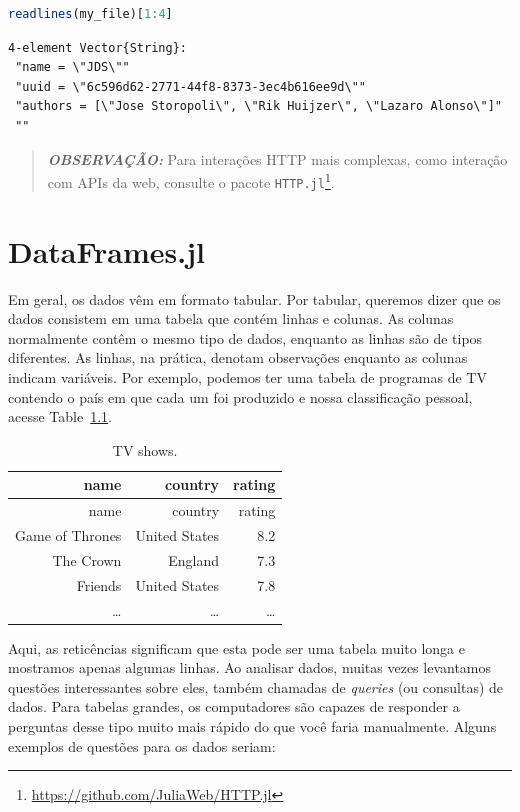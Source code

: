 \documentclass[
  notoc %
]{tufte-book}
\DeclareRobustCommand{\href}[2]{#2\footnote{\url{#1}}}
\newcommand{\passthrough}[1]{#1}
\begin{document}
\begin{lstlisting}[language=Julia]
readlines(my_file)[1:4]
\end{lstlisting}

\begin{lstlisting}[language=Output]
4-element Vector{String}:
 "name = \"JDS\""
 "uuid = \"6c596d62-2771-44f8-8373-3ec4b616ee9d\""
 "authors = [\"Jose Storopoli\", \"Rik Huijzer\", \"Lazaro Alonso\"]"
 ""
\end{lstlisting}

\begin{quote}
\textbf{\emph{OBSERVAÇÃO:}} Para interações HTTP mais complexas, como
interação com APIs da web, consulte o pacote
\href{https://github.com/JuliaWeb/HTTP.jl}{\passthrough{\lstinline!HTTP.jl!}}.
\end{quote}

\hypertarget{sec:dataframes}{%
\chapter{DataFrames.jl}\label{sec:dataframes}}

Em geral, os dados vêm em formato tabular. Por tabular, queremos dizer
que os dados consistem em uma tabela que contém linhas e colunas. As
colunas normalmente contêm o mesmo tipo de dados, enquanto as linhas são
de tipos diferentes. As linhas, na prática, denotam observações enquanto
as colunas indicam variáveis. Por exemplo, podemos ter uma tabela de
programas de TV contendo o país em que cada um foi produzido e nossa
classificação pessoal, acesse Table~\ref{tbl:TV_shows}.

\hypertarget{tbl:TV_shows}{}
\begin{longtable}[]{@{}rrr@{}}
\caption{\label{tbl:TV_shows}TV shows.}\tabularnewline
\toprule
name & country & rating \\
\midrule
\endfirsthead
\toprule
name & country & rating \\
\midrule
\endhead
Game of Thrones & United States & 8.2 \\
The Crown & England & 7.3 \\
Friends & United States & 7.8 \\
\ldots{} & \ldots{} & \ldots{} \\
\bottomrule
\end{longtable}

Aqui, as reticências significam que esta pode ser uma tabela muito longa
e mostramos apenas algumas linhas. Ao analisar dados, muitas vezes
levantamos questões interessantes sobre eles, também chamadas de
\emph{queries} (ou consultas) de dados. Para tabelas grandes, os
computadores são capazes de responder a perguntas desse tipo muito mais
rápido do que você faria manualmente. Alguns exemplos de questões para
os dados seriam:
\end{document}

